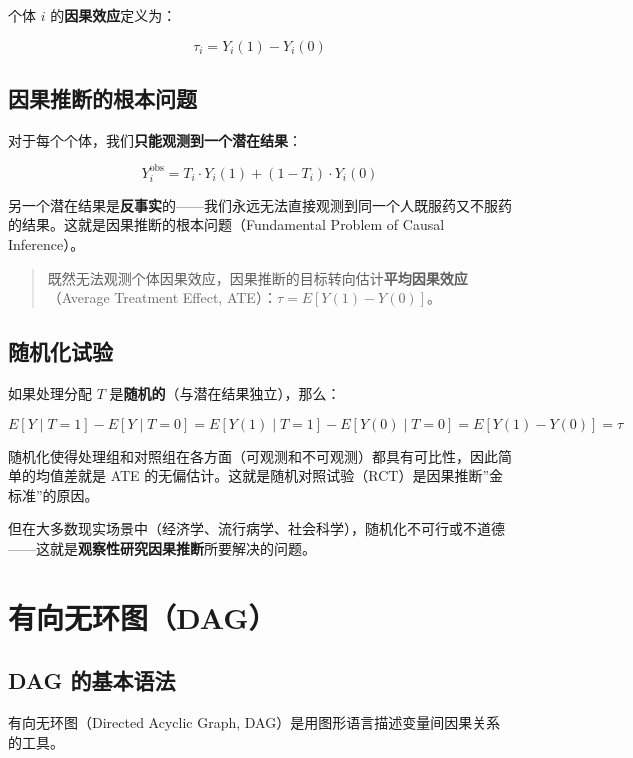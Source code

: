 \documentclass[
]{book}
\begin{document}
个体 \(i\) 的\textbf{因果效应}定义为：

\[\tau_i = Y_i(1) - Y_i(0)\]

\subsection{因果推断的根本问题}\label{ux56e0ux679cux63a8ux65adux7684ux6839ux672cux95eeux9898}

对于每个个体，我们\textbf{只能观测到一个潜在结果}：

\[Y_i^{\text{obs}} = T_i \cdot Y_i(1) + (1 - T_i) \cdot Y_i(0)\]

另一个潜在结果是\textbf{反事实}的------我们永远无法直接观测到同一个人既服药又不服药的结果。这就是因果推断的根本问题（Fundamental Problem of Causal Inference）。

\begin{quote}
既然无法观测个体因果效应，因果推断的目标转向估计\textbf{平均因果效应}（Average Treatment Effect, ATE）：\(\tau = E[Y(1) - Y(0)]\)。
\end{quote}

\subsection{随机化试验}\label{ux968fux673aux5316ux8bd5ux9a8c}

如果处理分配 \(T\) 是\textbf{随机的}（与潜在结果独立），那么：

\[E[Y \mid T=1] - E[Y \mid T=0] = E[Y(1) \mid T=1] - E[Y(0) \mid T=0] = E[Y(1) - Y(0)] = \tau\]

随机化使得处理组和对照组在各方面（可观测和不可观测）都具有可比性，因此简单的均值差就是 ATE 的无偏估计。这就是随机对照试验（RCT）是因果推断''金标准''的原因。

但在大多数现实场景中（经济学、流行病学、社会科学），随机化不可行或不道德------这就是\textbf{观察性研究因果推断}所要解决的问题。

\section{有向无环图（DAG）}\label{ux6709ux5411ux65e0ux73afux56fedag}

\subsection{DAG 的基本语法}\label{dag-ux7684ux57faux672cux8bedux6cd5}

有向无环图（Directed Acyclic Graph, DAG）是用图形语言描述变量间因果关系的工具。
\end{document}
